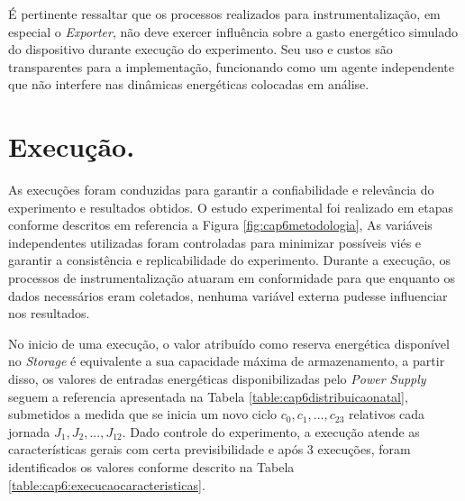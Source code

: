 É pertinente ressaltar que os processos realizados para instrumentalização, em especial o \textit{Exporter}, não deve exercer influência sobre a gasto energético simulado do dispositivo durante execução do experimento. Seu uso e custos são transparentes para a implementação, funcionando como um agente independente que não interfere nas dinâmicas energéticas colocadas em análise.

\section{Execução.}
\label{cap6:execucao}

As execuções foram conduzidas para garantir a confiabilidade e relevância do experimento e resultados obtidos. O estudo experimental foi realizado em etapas conforme descritos em referencia a Figura \ref{fig:cap6metodologia}, As variáveis independentes utilizadas foram controladas para minimizar possíveis viés e garantir a consistência e replicabilidade do experimento. Durante a execução, os processos de instrumentalização atuaram em conformidade para que enquanto os dados necessários eram coletados, nenhuma variável externa pudesse influenciar nos resultados.


No inicio de uma execução, o valor atribuído como reserva energética disponível no \textit{Storage} é equivalente a sua capacidade máxima de armazenamento, a partir disso, os valores de entradas energéticas disponibilizadas pelo \textit{Power Supply} seguem a referencia apresentada na Tabela \ref{table:cap6distribuicaonatal}, submetidos a medida que se inicia um novo ciclo $c_0, c_1,...,c_{23}$ relativos cada jornada $J_1, J_2, ..., J_{12}$. Dado controle do experimento, a execução atende as características gerais com certa previsibilidade e após 3 execuções, foram identificados os valores conforme descrito na Tabela \ref{table:cap6:execucaocaracteristicas}.

\begingroup

